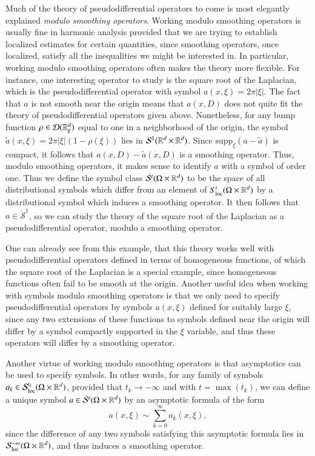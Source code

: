 Much of the theory of pseudodifferential operators to come is most elegantly explained \emph{modulo smoothing operators}. Working modulo smoothing operators is usually fine in harmonic analysis provided that we are trying to establish localized estimates for certain quantities, since smoothing operators, once localized, satisfy all the inequalities we might be interested in. In particular, working modulo smoothing operators often makes the theory more flexible. For instance, one interesting operator to study is the square root of the Laplacian, which is the pseudodifferential operator with symbol $a(x,\xi) = 2 \pi |\xi|$. The fact that $a$ is not smooth near the origin means that $a(x,D)$ does not quite fit the theory of pseudodifferential operators given above. Nonetheless, for any bump function $\rho \in \operatorname{\mathcal{D}}(\operatorname{\mathbb{R}}^d_\xi)$ equal to one in a neighborhood of the origin, the symbol $\tilde{a}(x,\xi) = 2 \pi |\xi| (1 - \rho(\xi))$ lies in $\mathcal{S}^1(\operatorname{\mathbb{R}}^d \times \operatorname{\mathbb{R}}^d)$. Since $\text{supp}_\xi(a - \tilde{a})$ is compact, it follows that $a(x,D) - \tilde{a}(x,D)$ is a smoothing operator. Thus, modulo smoothing operators, it makes sense to identify $a$ with a symbol of order one. Thus we define the symbol class $\dot{\mathcal{S}}^t(\Omega \times \operatorname{\mathbb{R}}^d)$ to be the space of all distributional symbols which differ from an element of $S_{\text{loc}}^t(\Omega \times \operatorname{\mathbb{R}}^d)$ by a distributional symbol which induces a smoothing operator. It then follows that $a \in \dot{\mathcal{S}}^1$, so we can study the theory of the square root of the Laplacian as a pseudodifferential operator, modulo a smoothing operator.

One can already see from this example, that this theory works well with pseudodifferential operators defined in terms of homogeneous functions, of which the square root of the Laplacian is a special example, since homogeneous functions often fail to be smooth at the origin. Another useful idea when working with symbols modulo smoothing operators is that we only need to specify pseudodifferential operators by symbols $a(x,\xi)$ defined for suitably large $\xi$, since any two extensions of these functions to symbols defined near the origin will differ by a symbol compactly supported in the $\xi$ variable, and thus these operators will differ by a smoothing operator.

Another virtue of working modulo smoothing operators is that asymptotics can be used to specify symbols. In other words, for any family of symbols $a_k \in \mathcal{S}^{t_k}_{\text{loc}}(\Omega \times \operatorname{\mathbb{R}}^d)$, provided that $t_k \to -\infty$ and with $t = \max(t_k)$, we can define a unique symbol $a \in \dot{\mathcal{S}}^t(\Omega \times \operatorname{\mathbb{R}}^d)$ by an asymptotic formula of the form
%
\[ a(x,\xi) \sim \sum_{k = 0}^\infty a_k(x,\xi), \]
%
since the difference of any two symbols satisfying this asymptotic formula lies in $\mathcal{S}^{-\infty}_{\text{loc}}(\Omega \times \operatorname{\mathbb{R}}^d)$, and thus induces a smoothing operator.

